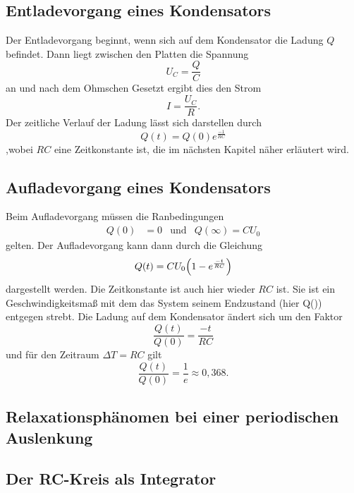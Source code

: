 \subsection{Entladevorgang eines Kondensators} %
\label{sub:Entladevorgang}
Der Entladevorgang beginnt, wenn sich auf dem Kondensator die Ladung $Q$ befindet.
Dann liegt zwischen den Platten die Spannung
\begin{equation}
    U_C = \frac{Q}{C}
\end{equation}
an und nach dem Ohmschen Gesetzt ergibt dies den Strom
\begin{equation}
    I = \frac{U_C}{R} .
\end{equation}
Der zeitliche Verlauf der Ladung lässt sich darstellen durch
\begin{equation}
    Q(t) = Q(0) e^{\frac{-1}{RC}}
\end{equation}
,wobei $RC$ eine Zeitkonstante ist, die im nächsten Kapitel näher erläutert wird.


\subsection{Aufladevorgang eines Kondensators} %
\label{sub:Aufladevorgang}
Beim Aufladevorgang müssen die Ranbedingungen
\begin{align}
    Q(0)&=0 &\text{und}& Q(\infty)=CU_0
\end{align}
gelten. Der Aufladevorgang kann dann durch die Gleichung
\begin{equation}
    Q(t)= CU_0\Bigl(1-e^{\frac{-t}{RC}}\Bigr)
\end{equation}
dargestellt werden. Die Zeitkonstante ist auch hier wieder $RC$ ist.
Sie ist ein Geschwindigkeitsmaß mit dem das System seinem Endzustand (hier Q(\infty)) entgegen strebt.
Die Ladung auf dem Kondensator ändert sich um den Faktor
\begin{equation}
    \frac{Q(t)}{Q(0)} = \frac{-t}{RC}
\end{equation}
und für den Zeitraum $\Delta T = RC$ gilt
\begin{equation}
    \frac{Q(t)}{Q(0)} = \frac{1}{e} \approx 0,368 .
\end{equation}



\subsection{Relaxationsphänomen bei einer periodischen Auslenkung} %
\label{sub:Rela_peri}


\subsection{Der RC-Kreis als Integrator} %
\label{sub:Integrator4}


